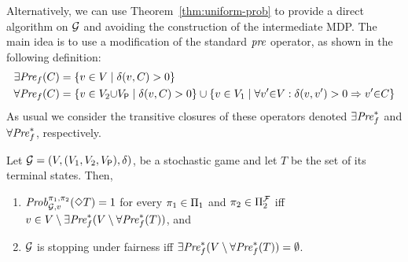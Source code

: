 Alternatively, we can use Theorem~\ref{thm:uniform-prob} to provide a
direct algorithm on $\mathcal{G}$ and avoiding the construction of the
intermediate MDP.
%
The main idea is to use a modification of the standard $\mathit{pre}$
operator, as shown in the following definition:
%
\begin{align*}
  \exists\mathit{Pre}_f(C) = {}&\{ v \in V \mid \delta(v,C) > 0\} \\
  \forall\mathit{Pre}_f(C) = {}&\{ v \in V_2{\cup} V_{\mathsf{P}} \mid \delta(v,C)>0\} 
                       \cup \{ v \in  V_1 \mid \forall v' {\in} V : \delta(v,v') > 0 \Rightarrow v' {\in} C \}
\end{align*}
As usual we consider the transitive closures of these operators denoted $\exists\mathit{Pre}_f^*$ and $\forall\mathit{Pre}_f^*$, respectively.
%
\begin{theorem}\label{thm:stopping-algorithm}
  Let $\mathcal{G} = (V, (V_1, V_2, V_{\mathsf{P}}), \delta)$, be a
  stochastic game and let $T$ be the set of its terminal states. Then,
  \begin{enumerate}[(1)]
  \item%
    $\mathit{Prob}^{\pi_{1}, \pi_{2}}_{\mathcal{G},v}(\Diamond T) = 1$ for every
    $\pi_{1} \in \Pi_{1}$ and $\pi_{2} \in \Pi^{\mathcal{F}}_{2}$
    iff $v \in V\setminus \exists\mathit{Pre}_f^*(V \setminus \forall\mathit{Pre}_f^*(T))$, and
  \item%
    $\mathcal{G}$ is stopping under fairness iff
    $\exists\mathit{Pre}_f^*(V \setminus \forall\mathit{Pre}_f^*(T)) = \emptyset$.
  \end{enumerate}
\end{theorem}




